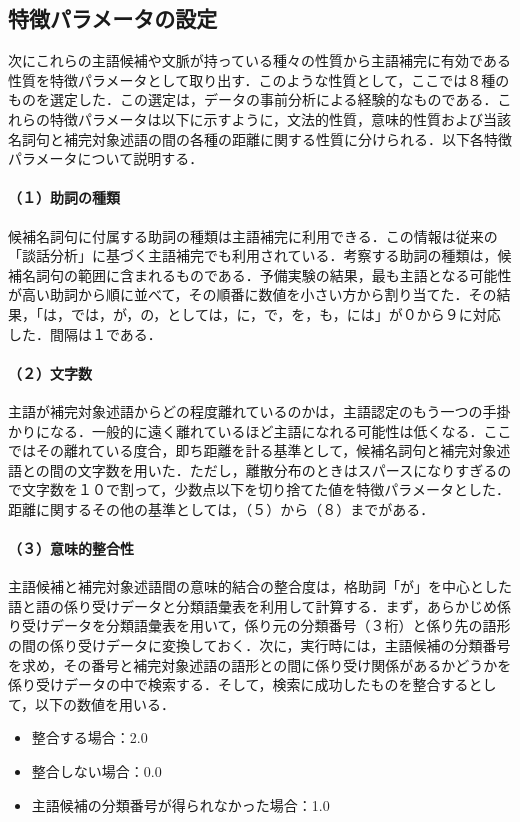 \subsection{特徴パラメータの設定} \label{subsec:特徴パラメータの設定}
次にこれらの主語候補や文脈が持っている種々の性質から主語補完に有効である性質を特徴パラメータとして取り出す．このような性質として，ここでは８種のものを選定した．この選定は，データの事前分析による経験的なものである．これらの特徴パラメータは以下に示すように，文法的性質，意味的性質および当該名詞句と補完対象述語の間の各種の距離に関する性質に分けられる．以下各特徴パラメータについて説明する．

\paragraph{（１）助詞の種類}
候補名詞句に付属する助詞の種類は主語補完に利用できる．この情報は従来の「談話分析」に基づく主語補完でも利用されている．考察する助詞の種類は，候補名詞句の範囲に含まれるものである．予備実験の結果，最も主語となる可能性が高い助詞から順に並べて，その順番に数値を小さい方から割り当てた．その結果，「は，では，が，の，としては，に，で，を，も，には」が０から９に対応した．間隔は１である．

\paragraph{（２）文字数}
主語が補完対象述語からどの程度離れているのかは，主語認定のもう一つの手掛かりになる．一般的に遠く離れているほど主語になれる可能性は低くなる．ここではその離れている度合，即ち距離を計る基準として，候補名詞句と補完対象述語との間の文字数を用いた．ただし，離散分布のときはスパースになりすぎるので文字数を１０で割って，少数点以下を切り捨てた値を特徴パラメータとした．距離に関するその他の基準としては，（５）から（８）までがある．

\paragraph{（３）意味的整合性}
主語候補と補完対象述語間の意味的結合の整合度は，格助詞「が」を中心とした語と語の係り受けデータ\cite{田中89}と分類語彙表\cite{国語研64}を利用して計算する．まず，あらかじめ係り受けデータを分類語彙表を用いて，係り元の分類番号（３桁）と係り先の語形の間の係り受けデータに変換しておく．次に，実行時には，主語候補の分類番号を求め，その番号と補完対象述語の語形との間に係り受け関係があるかどうかを係り受けデータの中で検索する．そして，検索に成功したものを整合するとして，以下の数値を用いる．
\begin{itemize}
 \item 整合する場合：2.0　
 \item 整合しない場合：0.0
 \item 主語候補の分類番号が得られなかった場合：1.0
\end{itemize}

